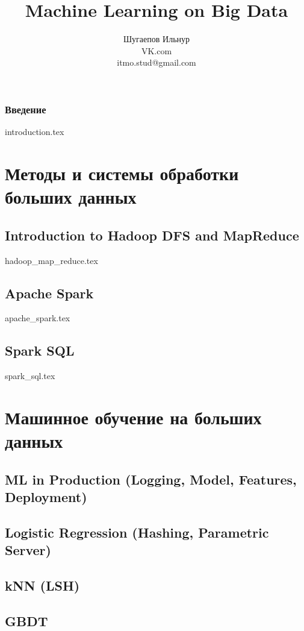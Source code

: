 \documentclass[openany,12pt]{book}
\title{Machine Learning on Big Data}
\author{Шугаепов Ильнур 
\\
\small{VK.com} 
\\
\small{itmo.stud@gmail.com}}
\date{}
\numberwithin{equation}{section}
\begin{document}
\maketitle

\tableofcontents

\section*{Введение}
{introduction.tex}
 
\part{Методы и системы обработки больших данных}
\chapter{Introduction to Hadoop DFS and MapReduce}
{hadoop_map_reduce.tex}


\chapter{Apache Spark}
{apache_spark.tex}

\chapter{Spark SQL}
{spark_sql.tex}

\part{Машинное обучение на больших данных}
\chapter{ML in Production (Logging, Model, Features, Deployment)}

\chapter{Logistic Regression (Hashing, Parametric Server)}

\chapter{kNN (LSH)}

\chapter{GBDT}
\end{document}
